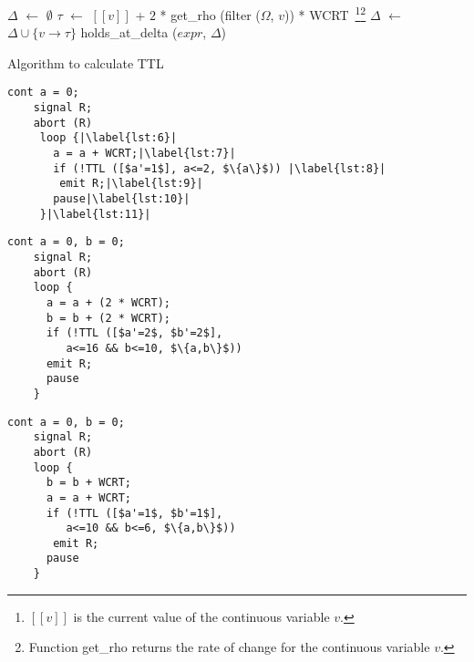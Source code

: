 \documentclass[10pt,journal,cspaper,compsoc]{IEEEtran}
\begin{document}
\begin{algorithm}[t!]
  \begin{minipage}{1.0\linewidth}
    $\Delta$ $\leftarrow$ $\emptyset$\;
     {
      $\tau$ $\leftarrow$ $[\![v]\!]$ + $2$ * get\_rho (filter
      ($\Omega$, $v$)) * WCRT~\footnote{$[\![v]\!]$ is the current
        value of the continuous variable $v$.}\footnote{Function
        get\_rho returns the rate of change for the continuous variable
        $v$.}\label{alg:1:l1}\;
      $\Delta$ $\leftarrow$ $\Delta \cup \{v \rightarrow \tau \}$\;
    }
    \Return holds\_at\_delta ($expr$, $\Delta$)\;
    \caption{Algorithm to calculate TTL}
    \label{alg:1}
  \end{minipage}
\end{algorithm}

\newbox{\rfirst}
\begin{lrbox}{\rfirst}
  \begin{lstlisting}[mathescape,style=sysj,morekeywords={until,wait_inbetween,cont,signal,loop,abort,await,emit,present,trap,pause,exit,delay,suspend},escapechar=|]
    cont a = 0;
    signal R;
    abort (R) 
     loop {|\label{lst:6}|
       a = a + WCRT;|\label{lst:7}|
       if (!TTL ([$a'=1$], a<=2, $\{a\}$)) |\label{lst:8}|
        emit R;|\label{lst:9}|
       pause|\label{lst:10}|
     }|\label{lst:11}|
  \end{lstlisting}
\end{lrbox}

\newbox{\rsecond}
\begin{lrbox}{\rsecond}
  \begin{lstlisting}[mathescape,style=sysj,morekeywords={until,wait_inbetween,cont,signal,loop,abort,await,emit,present,trap,pause,exit,delay,suspend}]
    cont a = 0, b = 0;
    signal R;
    abort (R) 
    loop {
      a = a + (2 * WCRT);
      b = b + (2 * WCRT);
      if (!TTL ([$a'=2$, $b'=2$], 
         a<=16 && b<=10, $\{a,b\}$)) 
      emit R;
      pause
    }
  \end{lstlisting}
\end{lrbox}

\newbox{\rthird}
\begin{lrbox}{\rthird}
  \begin{lstlisting}[mathescape,style=sysj,morekeywords={until,wait_inbetween,cont,signal,loop,abort,await,emit,present,trap,pause,exit,delay,suspend}]
    cont a = 0, b = 0;
    signal R;
    abort (R) 
    loop {
      b = b + WCRT;
      a = a + WCRT;
      if (!TTL ([$a'=1$, $b'=1$], 
         a<=10 && b<=6, $\{a,b\}$)) 
       emit R;
      pause
    }
  \end{lstlisting}
\end{lrbox}
\end{document}
